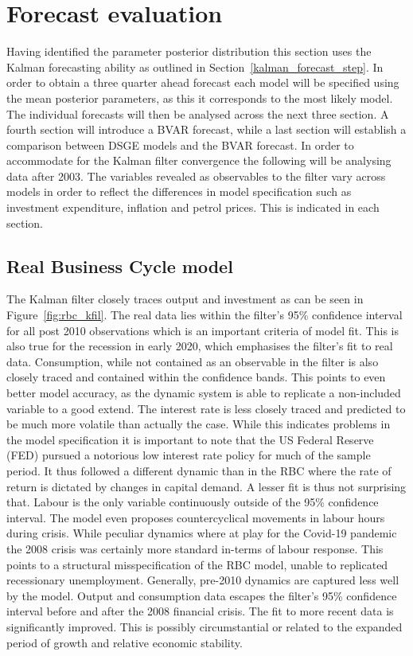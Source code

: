 \documentclass[12pt,a4paper,english]{article} %
\let\oldsection\section
\renewcommand\section{\clearpage\oldsection}
\begin{document}
	\section{Forecast evaluation} \label{forecast_eval}
	Having identified the parameter posterior distribution this section uses the Kalman forecasting ability as outlined in Section~\ref{kalman_forecast_step}. In order to obtain a three quarter ahead forecast each model will be specified using the mean posterior parameters, as this it corresponds to the most likely model. The individual forecasts will then be analysed across the next three section. A fourth section will introduce a \ac{BVAR} forecast, while a last section will establish a comparison between DSGE models and the \ac{BVAR} forecast.	In order to accommodate for the Kalman filter convergence the following will be analysing data after 2003. The variables revealed as observables to the filter vary across models in order to reflect the differences in model specification such as investment expenditure, inflation and petrol prices. This is indicated in each section.
	
	\subsection{Real Business Cycle model}	
	The Kalman filter closely traces output and investment as can be seen in Figure~\ref{fig:rbc_kfil}. The real data lies within the filter's 95\% confidence interval for all post 2010 observations which is an important criteria of model fit. This is also true for the recession in early 2020, which emphasises the filter's fit to real data. Consumption, while not contained as an observable in the filter is also closely traced and contained within the confidence bands. This points to even better model accuracy, as the dynamic system is able to replicate a non-included variable to a good extend. The interest rate is less closely traced and predicted to be much more volatile than actually the case. While this indicates problems in the model specification it is important to note that the US Federal Reserve (FED) pursued a notorious low interest rate policy for much of the sample period. It thus followed a different dynamic than in the RBC where the rate of return is dictated by changes in capital demand. A lesser fit is thus not surprising that. Labour is the only variable continuously outside of the 95\% confidence interval. The model even proposes countercyclical movements in labour hours during crisis. While peculiar dynamics where at play for the Covid-19 pandemic the 2008 crisis was certainly more standard in-terms of labour response. This points to a structural misspecification of the RBC model, unable to replicated recessionary unemployment.
	Generally, pre-2010 dynamics are captured less well by the model. Output and consumption data escapes the filter's 95\% confidence interval before and after the 2008 financial crisis. The fit to more recent data is significantly improved. This is possibly circumstantial or related to the expanded period of growth and relative economic stability.\\
				
\end{document}
